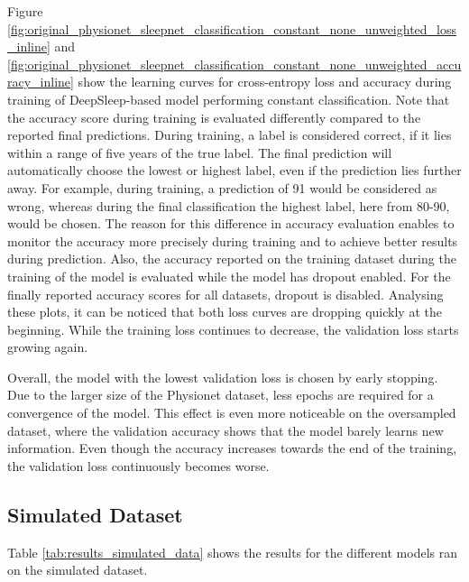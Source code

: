 \documentclass[11pt]{scrartcl}
\begin{document}
Figure \ref{fig:original_physionet_sleepnet_classification_constant_none_unweighted_loss_inline} and \ref{fig:original_physionet_sleepnet_classification_constant_none_unweighted_accuracy_inline} show the learning curves for cross-entropy loss and accuracy during training of DeepSleep-based model performing constant classification. Note that the accuracy score during training is evaluated differently compared to the reported final predictions. During training, a label is considered correct, if it lies within a range of five years of the true label. The final prediction will automatically choose the lowest or highest label, even if the prediction lies further away. For example, during training, a prediction of 91 would be considered as wrong, whereas during the final classification the highest label, here from 80-90, would be chosen. The reason for this difference in accuracy evaluation enables to monitor the accuracy more precisely during training and to achieve better results during prediction. Also, the accuracy reported on the training dataset during the training of the model is evaluated while the model has dropout enabled. For the finally reported accuracy scores for all datasets, dropout is disabled. Analysing these plots, it can be noticed that both loss curves are dropping quickly at the beginning. While the training loss continues to decrease, the validation loss starts growing again.

Overall, the model with the lowest validation loss is chosen by early stopping. Due to the larger size of the Physionet dataset, less epochs are required for a convergence of the model. This effect is even more noticeable on the oversampled dataset, where the validation accuracy shows that the model barely learns new information. Even though the accuracy increases towards the end of the training, the validation loss continuously becomes worse.

\FloatBarrier
\subsection{Simulated Dataset}

Table \ref{tab:results_simulated_data} shows the results for the different models ran on the simulated dataset.
\end{document}
